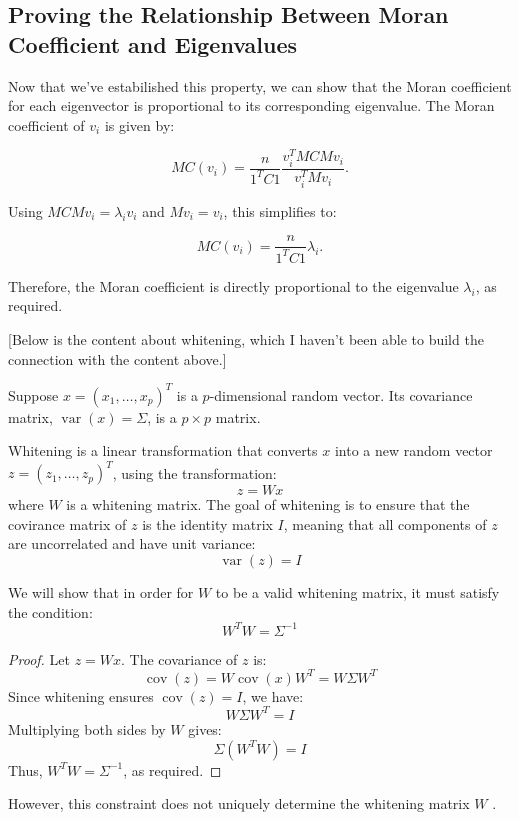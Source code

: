 \documentclass[12pt]{article}
\begin{document}
\subsection*{Proving the Relationship Between Moran Coefficient and Eigenvalues}

Now that we've estabilished this property, we can show that the Moran coefficient for each eigenvector is proportional to its corresponding eigenvalue. The Moran coefficient of \( v_i \) is given by:

\[
  M C (v_i)=\frac{n}{1^T C 1} \frac{v_i^T M C M v_i}{v_i^T M v_i} .
\]

Using \( M C M v_i = \lambda_i v_i \) and \( M v_i = v_i \), this simplifies to:

\[
  M C (v_i)=\frac{n}{1^T C 1} \lambda_i.
\]

Therefore, the Moran coefficient is directly proportional to the eigenvalue \( \lambda_i \), as required.

[Below is the content about whitening, which I haven't been able to build the connection with the content above.]

Suppose \( x=\left(x_1, \ldots, x_p\right)^T \) is a \( p \)-dimensional random vector. Its covariance matrix, \( \operatorname{var} (x) = \Sigma \), is a  \( p \times p \) matrix.

Whitening is a linear transformation that converts \( x \) into a new random vector \( z=\left(z_1, \ldots, z_p\right)^T \), using the transformation:
\[
  z = W x
\]
where \( W \) is a whitening matrix. The goal of whitening is to ensure that the covirance matrix of \( z \) is the identity matrix \( I \), meaning that all components of \( z \) are uncorrelated and have unit variance:
\[
  \operatorname{var}(z)=I
\]

We will show that in order for \( W \) to be a valid whitening matrix, it must satisfy the condition:
\[
  W^T W=\Sigma^{-1}
\]

\begin{proof}
  Let \( z = W x \). The covariance of \( z \) is:
  \[
    \operatorname{cov}(z) = W \operatorname{cov}(x) W^T = W \Sigma W^T
  \]
  Since whitening ensures \( \operatorname{cov}(z) = I \), we have:
  \[
    W \Sigma W^T = I
  \]
  Multiplying both sides by \( W \) gives:
  \[
    \Sigma (W^T W) = I
  \]
  Thus, \( W^T W = \Sigma^{-1} \), as required.
\end{proof}

However, this constraint does not uniquely determine the whitening matrix \( W \) \cite{kessy2018optimal}.
\end{document}
